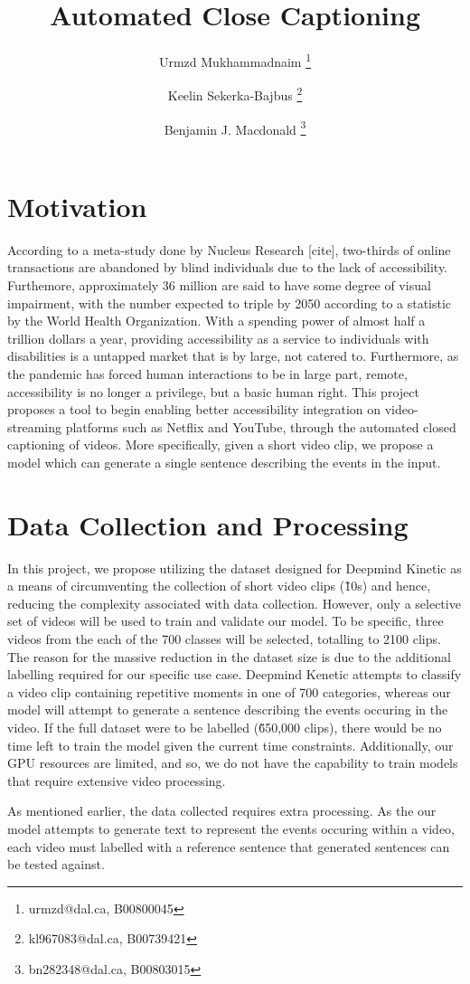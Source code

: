 \documentclass[11pt]{article}
\title{Automated Close Captioning}
\author[1]{Urmzd Mukhammadnaim \thanks{urmzd@dal.ca, B00800045}}
\author[1]{Keelin Sekerka-Bajbus \thanks{kl967083@dal.ca, B00739421 }}
\author[1]{Benjamin J. Macdonald \thanks{bn282348@dal.ca, B00803015}}
\affil[1]{Faculty of Computer Science, Dalhousie University}
\begin{document}
\maketitle

\section{Motivation}
According to a meta-study done by Nucleus Research [cite], two-thirds
of online transactions are abandoned by blind individuals due to the lack of accessibility.
Furthemore, approximately 36 million are said to have some degree of visual impairment, with the number
expected to triple by 2050 according to a statistic by the World Health Organization.
With a spending power of almost half a trillion dollars a year, providing accessibility
as a service to individuals with disabilities is a untapped market that is by large, not catered to.
Furthermore, as the pandemic has forced human interactions to be in large part, remote, accessibility is no longer
a privilege, but a basic human right. This project proposes a tool to begin enabling better accessibility
integration on video-streaming platforms such as Netflix and YouTube, through the automated
closed captioning of videos. More specifically, given a short video clip, we propose a model which
can generate a single sentence describing the events in the input.

\newpage
\section{Data Collection and Processing}
In this project, we propose utilizing the dataset designed for Deepmind Kinetic as a means of
circumventing the collection of short video clips (\~10s) and hence, reducing the complexity associated
with data collection. However, only a selective set of videos will be used to train and validate
our model. To be specific, three videos from the each of the 700 classes will be selected, totalling
to 2100 clips. The reason for the massive reduction in the dataset size is due to the additional labelling
required for our specific use case. Deepmind Kenetic attempts to classify a video clip containing repetitive moments
in one of 700 categories, whereas our model will attempt to generate a sentence describing the events occuring in the video.
If the full dataset were to be labelled (\~650,000 clips), there would be no time left to train the model given the current time
constraints. Additionally, our GPU resources are limited, and so, we do not have the capability to train models
that require extensive video processing.

As mentioned earlier, the data collected requires extra processing. As the our model attempts to generate text to represent
the events occuring within a video, each video must labelled with a reference sentence that generated sentences can be tested against.
\end{document}
